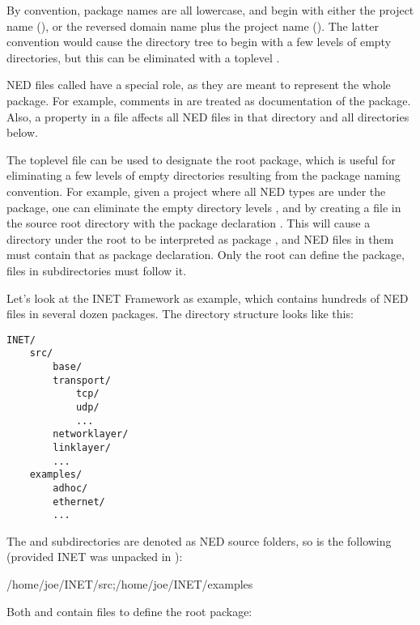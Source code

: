By convention, package names are all lowercase, and begin with either
the project name (), or the reversed domain name plus the
project name (). The latter convention
would cause the directory tree to begin with a few levels of empty
directories, but this can be eliminated with a toplevel .

NED files called  have a special role, as they are meant
to represent the whole package. For example, comments in
 are treated as documentation of the package. Also, a
 property in a  file affects all NED
files in that directory and all directories below.

The toplevel  file can be used to designate the root
package, which is useful for eliminating a few levels of empty directories
resulting from the package naming convention. For example, given a project
where all NED types are under the  package, one can
eliminate the empty directory levels ,  and  by
creating a  file in the source root directory with
the package declaration . This will cause a
directory  under the root to be interpreted as package
, and NED files in them must contain that as
package declaration. Only the root  can define the
package,  files in subdirectories must follow it.

Let's look at the INET Framework as example, which contains hundreds of NED
files in several dozen packages. The directory structure looks like this:

\begin{Verbatim}
INET/
    src/
        base/
        transport/
            tcp/
            udp/
            ...
        networklayer/
        linklayer/
        ...
    examples/
        adhoc/
        ethernet/
        ...
\end{Verbatim}

The  and  subdirectories are denoted as NED source
folders, so  is the following (provided INET was unpacked in
):

\begin{filelisting}
/home/joe/INET/src;/home/joe/INET/examples
\end{filelisting}

Both  and  contain  files to
define the root package:

